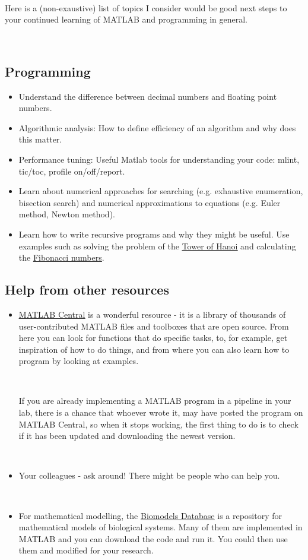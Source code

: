\documentclass[11pt]{amsart}
\begin{document}
\

Here is a (non-exaustive) list of topics I consider would be good  next steps to your continued learning of MATLAB and programming in general.

\

\subsection{Programming}
\begin{itemize}
\item Understand the difference between decimal numbers and floating point numbers.
\item Algorithmic analysis: How to define efficiency of an algorithm and why does this matter.
\item Performance tuning: Useful Matlab tools for understanding your code: mlint, tic/toc, profile on/off/report.
\item Learn about numerical approaches for searching (e.g. exhaustive enumeration, bisection search) and numerical approximations to equations (e.g. Euler method, Newton method).
\item Learn how to write recursive programs and why they might be useful. Use examples such as solving the problem of the \href{https://en.wikipedia.org/wiki/Tower_of_Hanoi}{\underline{Tower of Hanoi}} and calculating the \href{https://en.wikipedia.org/wiki/Fibonacci_number}{\underline{Fibonacci numbers}}.
\end{itemize}

\subsection{Help from other resources}
\begin{itemize}
\item \href{http://de.mathworks.com/matlabcentral/}{\underline{MATLAB Central}} is a wonderful resource - it is a library of thousands of user-contributed MATLAB files and toolboxes that are open source. From here you can look for functions that do specific tasks, to, for example, get inspiration of how to do things, and from where you can also learn how to program by looking at examples.

\

If you are already implementing a MATLAB program in a pipeline in your lab, there is a chance that whoever wrote it, may have posted the program on MATLAB Central, so when it stops working, the first thing to do is to check if it has been updated and downloading the newest version.

\

\item Your colleagues - ask around! There might be people who can help you.

\

\item For mathematical modelling, the \href{https://www.ebi.ac.uk/biomodels-main/}{\underline{Biomodels Database}} is a repository for mathematical models of biological systems. Many of them are implemented in MATLAB and you can download the code and run it. You could then use them and modified for your research.
\end{itemize}
\end{document}
